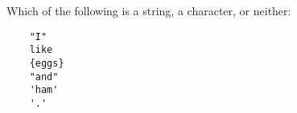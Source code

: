 Which of the following is a string, a character, or neither:
\begin{verbatim}
    "I"      
    like     
    {eggs}   
    "and"    
    'ham'    
    '.'      
\end{verbatim}
